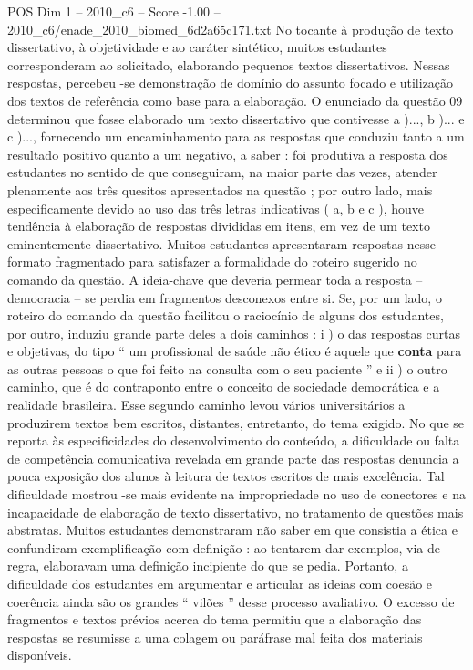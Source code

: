 \begin{textsample}{POS Dim 1 – 2010\_c6 – Score -1.00 – 2010\_c6/enade\_2010\_biomed\_6d2a65c171.txt}
No tocante à produção de texto dissertativo, à objetividade e ao caráter sintético, muitos estudantes corresponderam ao solicitado, elaborando pequenos textos dissertativos.
Nessas respostas, percebeu -se demonstração de domínio do assunto focado e utilização dos textos de referência como base para a elaboração.
O enunciado da questão 09 determinou que fosse elaborado um texto dissertativo que contivesse a )..., b )... e c )..., fornecendo um encaminhamento para as respostas que conduziu tanto a um resultado positivo quanto a um negativo, a saber : foi produtiva a resposta dos estudantes no sentido de que conseguiram, na maior parte das vezes, atender plenamente aos três quesitos apresentados na questão ; por outro lado, mais especificamente devido ao uso das três letras indicativas ( a, b e c ), houve tendência à elaboração de respostas divididas em itens, em vez de um texto eminentemente dissertativo.
Muitos estudantes apresentaram respostas nesse formato fragmentado para satisfazer a formalidade do roteiro sugerido no comando da questão.
A ideia-chave que deveria permear toda a resposta – democracia – se perdia em fragmentos desconexos entre si.
Se, por um lado, o roteiro do comando da questão facilitou o raciocínio de alguns dos estudantes, por outro, induziu grande parte deles a dois caminhos : i ) o das respostas curtas e objetivas, do tipo “ um profissional de saúde não ético é aquele que \textbf{conta} para as outras pessoas o que foi feito na consulta com o seu paciente ” e ii ) o outro caminho, que é do contraponto entre o conceito de sociedade democrática e a realidade brasileira.
Esse segundo caminho levou vários universitários a produzirem textos bem escritos, distantes, entretanto, do tema exigido.
No que se reporta às especificidades do desenvolvimento do conteúdo, a dificuldade ou falta de competência comunicativa revelada em grande parte das respostas denuncia a pouca exposição dos alunos à leitura de textos escritos de mais excelência.
Tal dificuldade mostrou -se mais evidente na impropriedade no uso de conectores e na incapacidade de elaboração de texto dissertativo, no tratamento de questões mais abstratas.
Muitos estudantes demonstraram não saber em que consistia a ética e confundiram exemplificação com definição : ao tentarem dar exemplos, via de regra, elaboravam uma definição incipiente do que se pedia.
Portanto, a dificuldade dos estudantes em argumentar e articular as ideias com coesão e coerência ainda são os grandes “ vilões ” desse processo avaliativo.
O excesso de fragmentos e textos prévios acerca do tema permitiu que a elaboração das respostas se resumisse a uma colagem ou paráfrase mal feita dos materiais disponíveis.

\end{textsample}

